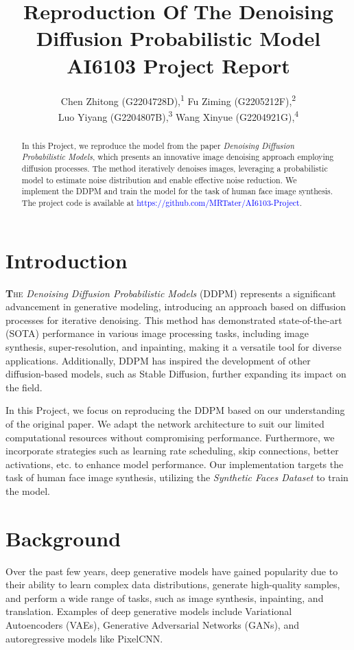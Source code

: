 \documentclass[letterpaper]{article} %
\title{Reproduction Of The Denoising Diffusion Probabilistic Model \\ AI6103 Project Report}
\author {
    Chen Zhitong (G2204728D),\textsuperscript{\rm 1}
    Fu Ziming (G2205212F),\textsuperscript{\rm 2}\\
    Luo Yiyang (G2204807B),\textsuperscript{\rm 3}
    Wang Xinyue (G2204921G),\textsuperscript{\rm 4}
}
\begin{document}
\maketitle

\begin{abstract}
In this Project, we reproduce the model from the paper \textit{Denoising Diffusion Probabilistic Models}, which presents an innovative image denoising approach employing diffusion processes. The method iteratively denoises images, leveraging a probabilistic model to estimate noise distribution and enable effective noise reduction. We implement the DDPM and train the model for the task of human face image synthesis. The project code is available at \textcolor{blue}{https://github.com/MRTater/AI6103-Project}.
\end{abstract}

\section{Introduction}
\lettrine[lines=2, findent=3pt, nindent=0pt]{\textbf{T}}{he} \textit{Denoising Diffusion Probabilistic Models} (DDPM) represents a significant advancement in generative modeling, introducing an approach based on diffusion processes for iterative denoising. This method has demonstrated state-of-the-art (SOTA) performance in various image processing tasks, including image synthesis, super-resolution, and inpainting, making it a versatile tool for diverse applications. Additionally, DDPM has inspired the development of other diffusion-based models, such as Stable Diffusion, further expanding its impact on the field.

In this Project, we focus on reproducing the DDPM based on our understanding of the original paper. We adapt the network architecture to suit our limited computational resources without compromising performance. Furthermore, we incorporate strategies such as learning rate scheduling, skip connections, better activations, etc. to enhance model performance. Our implementation targets the task of human face image synthesis, utilizing the \textit{Synthetic Faces Dataset}\cite{david_beniaguev_2022} to train the model.

\section{Background}
Over the past few years, deep generative models have gained popularity due to their ability to learn complex data distributions, generate high-quality samples, and perform a wide range of tasks, such as image synthesis, inpainting, and translation. Examples of deep generative models include Variational Autoencoders (VAEs), Generative Adversarial Networks (GANs), and autoregressive models like PixelCNN.
\end{document}
